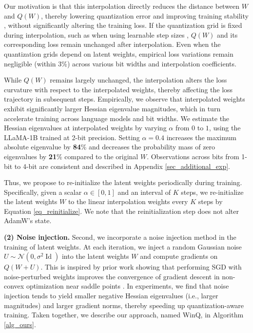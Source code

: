 \documentclass{article}
\theoremstyle{definition}
\DeclareMathOperator{\id}{Id}
\newcommand{\acronym}{{\sc WinQ}}
\begin{document}
Our motivation is that this interpolation directly reduces the distance between $W$ and $Q(W)$, thereby lowering quantization error and improving training stability \citep{panferov2025quest}, without significantly altering the training loss. If the quantization grid is fixed during interpolation, such as when using learnable step sizes \cite{esser2020learned}, $Q(W)$ and its corresponding loss remain unchanged after interpolation. Even when the quantization grids depend on latent weights, empirical loss variations remain negligible (within 3\%) across various bit widths and interpolation coefficients.


While $Q(W)$ remains largely unchanged, the interpolation alters the loss curvature with respect to the interpolated weights, thereby affecting the loss trajectory in subsequent steps. 
Empirically, we observe that interpolated weights exhibit significantly larger Hessian eigenvalue magnitudes, which in turn accelerate training across language models and bit widths. We estimate the Hessian eigenvalues at interpolated weights by varying $\alpha$ from $0$ to $1$, using the LLaMA-1B trained at 2-bit precision. Setting $\alpha=0.4$ increases the maximum absolute eigenvalue by \textbf{84}\% and decreases the probability mass of zero eigenvalues by \textbf{21}\% compared to the original $W$. Observations across bits from 1-bit to 4-bit are consistent and described in Appendix \ref{sec_additional_exp}. 

Thus, we propose to re-initialize the latent weights periodically during training. Specifically, given a scalar $\alpha \in [0, 1]$ and an interval of $K$ steps, we re-initialize the latent weights $W$ to the linear interpolation weights every $K$ steps by Equation \ref{eq_reinitialize}. We note that the reinitialization step does not alter AdamW's state.

\textbf{(2) Noise injection.} Second, we incorporate a noise injection method in the training of latent weights. At each iteration, we inject a random Gaussian noise $U \sim \mathcal{N}(0, \sigma^2 \id)$ into the latent weights $W$ and compute gradients on $Q(W+U)$. This is inspired by prior work showing that performing SGD with noise-perturbed weights improves the convergence of gradient descent in non-convex optimization near saddle points \citep{jin2017escape}.  In experiments, we find that noise injection tends to yield smaller negative Hessian eigenvalues (i.e., larger magnitudes) and larger gradient norms, thereby speeding up quantization-aware training.
Taken together, we describe our approach, named \acronym{}, in Algorithm \ref{alg_ours}.
\end{document}
